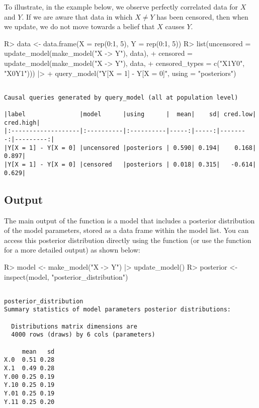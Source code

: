 \documentclass[
  11pt,
  article]{jss}
\renewcommand{\texttt}[1]{\code{#1}}
\begin{document}
To illustrate, in the example below, we observe perfectly correlated
data for \(X\) and \(Y\). If we are aware that data in which
\(X \neq Y\) has been censored, then when we update, we do not move
towards a belief that \(X\) causes \(Y\).

\begin{CodeInput}
R> data <- data.frame(X = rep(0:1, 5), Y = rep(0:1, 5))
R> list(uncensored = update_model(make_model("X -> Y"), data),
+    censored = update_model(make_model("X -> Y"), data, 
+    censored_types = c("X1Y0",  "X0Y1"))) |>
+    query_model("Y[X = 1] - Y[X = 0]", using = "posteriors")
\end{CodeInput}

\begin{verbatim}

Causal queries generated by query_model (all at population level)

|label               |model      |using      |  mean|    sd| cred.low| cred.high|
|:-------------------|:----------|:----------|-----:|-----:|--------:|---------:|
|Y[X = 1] - Y[X = 0] |uncensored |posteriors | 0.590| 0.194|    0.168|     0.897|
|Y[X = 1] - Y[X = 0] |censored   |posteriors | 0.018| 0.315|   -0.614|     0.629|
\end{verbatim}

\subsection{Output}\label{output}

The main output of the \texttt{update\_model()} function is a model that
includes a posterior distribution of the model parameters, stored as a
data frame within the model list. You can access this posterior
distribution directly using the \texttt{grab()} function (or use the
\texttt{inspect()} function for a more detailed output) as shown below:

\begin{CodeInput}
R> model <- make_model("X -> Y") |> update_model()
R> posterior <- inspect(model, "posterior_distribution")  
\end{CodeInput}

\begin{verbatim}

posterior_distribution
Summary statistics of model parameters posterior distributions:

  Distributions matrix dimensions are 
  4000 rows (draws) by 6 cols (parameters)

     mean   sd
X.0  0.51 0.28
X.1  0.49 0.28
Y.00 0.25 0.19
Y.10 0.25 0.19
Y.01 0.25 0.19
Y.11 0.25 0.20
\end{verbatim}
\end{document}
